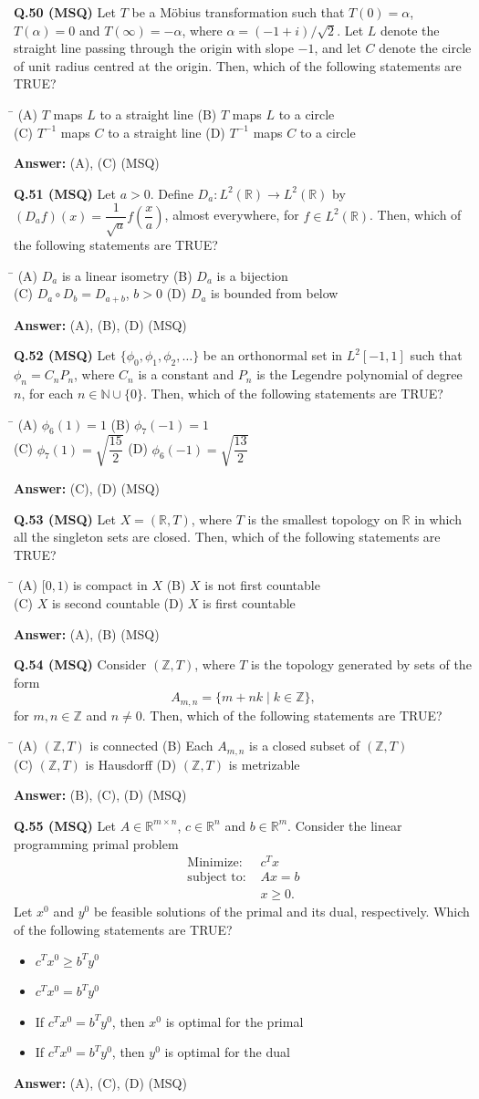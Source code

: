 \documentclass[11pt,a4paper]{article}
\newcommand{\optsfourA}[4]{%
  \begin{tabbing}
    \hspace{0.48\linewidth}\=\kill
    (A) #1 \> (B) #2 \\[2pt]
    (C) #3 \> (D) #4
  \end{tabbing}%
}
\newcommand{\optslistA}[4]{%
  \begin{itemize}
    \setlength{\itemsep}{2pt}\setlength{\parskip}{0pt}
    \item[(A)] #1
    \item[(B)] #2
    \item[(C)] #3
    \item[(D)] #4
  \end{itemize}%
}
\newcommand{\ans}[1]{\textbf{Answer:} #1\par\medskip}
\begin{document}
\textbf{Q.50 (MSQ)} Let $T$ be a M\"obius transformation such that $T(0) = \alpha$, $T(\alpha) = 0$ and $T(\infty) = -\alpha$, where $\alpha = (-1 + i)/\sqrt{2}$. Let $L$ denote the straight line passing through the origin with slope $-1$, and let $C$ denote the circle of unit radius centred at the origin. Then, which of the following statements are TRUE?
\optsfourA{$T$ maps $L$ to a straight line}{$T$ maps $L$ to a circle}{$T^{-1}$ maps $C$ to a straight line}{$T^{-1}$ maps $C$ to a circle}
\ans{(A), (C) (MSQ)}

\textbf{Q.51 (MSQ)} Let $a > 0$. Define $D_a : L^2(\mathbb{R}) \to L^2(\mathbb{R})$ by $(D_a f)(x) = \dfrac{1}{\sqrt{a}} f\!\left(\dfrac{x}{a}\right)$, almost everywhere, for $f \in L^2(\mathbb{R})$. Then, which of the following statements are TRUE?
\optsfourA{$D_a$ is a linear isometry}{$D_a$ is a bijection}{$D_a \circ D_b = D_{a+b}$, $b > 0$}{$D_a$ is bounded from below}
\ans{(A), (B), (D) (MSQ)}

\textbf{Q.52 (MSQ)} Let $\{\phi_0, \phi_1, \phi_2, \dots\}$ be an orthonormal set in $L^2[-1, 1]$ such that $\phi_n = C_n P_n$, where $C_n$ is a constant and $P_n$ is the Legendre polynomial of degree $n$, for each $n \in \mathbb{N} \cup \{0\}$. Then, which of the following statements are TRUE?
\optsfourA{$\phi_6(1) = 1$}{$\phi_7(-1) = 1$}{$\phi_7(1) = \sqrt{\dfrac{15}{2}}$}{$\phi_6(-1) = \sqrt{\dfrac{13}{2}}$}
\ans{(C), (D) (MSQ)}

\textbf{Q.53 (MSQ)} Let $X = (\mathbb{R}, T)$, where $T$ is the smallest topology on $\mathbb{R}$ in which all the singleton sets are closed. Then, which of the following statements are TRUE?
\optsfourA{$[0, 1)$ is compact in $X$}{$X$ is not first countable}{$X$ is second countable}{$X$ is first countable}
\ans{(A), (B) (MSQ)}

\textbf{Q.54 (MSQ)} Consider $(\mathbb{Z}, T)$, where $T$ is the topology generated by sets of the form
\[
  A_{m,n} = \{m + nk \mid k \in \mathbb{Z}\},
\]
for $m, n \in \mathbb{Z}$ and $n \neq 0$. Then, which of the following statements are TRUE?
\optsfourA{$(\mathbb{Z}, T)$ is connected}{Each $A_{m,n}$ is a closed subset of $(\mathbb{Z}, T)$}{$(\mathbb{Z}, T)$ is Hausdorff}{$(\mathbb{Z}, T)$ is metrizable}
\ans{(B), (C), (D) (MSQ)}

\textbf{Q.55 (MSQ)} Let $A \in \mathbb{R}^{m \times n}$, $c \in \mathbb{R}^n$ and $b \in \mathbb{R}^m$. Consider the linear programming primal problem
\begin{align*}
  \text{Minimize: } & c^T x \\
  \text{subject to: } & Ax = b \\
                      & x \ge 0.
\end{align*}
Let $x^0$ and $y^0$ be feasible solutions of the primal and its dual, respectively. Which of the following statements are TRUE?
\optslistA{$c^T x^0 \ge b^T y^0$}{$c^T x^0 = b^T y^0$}{If $c^T x^0 = b^T y^0$, then $x^0$ is optimal for the primal}{If $c^T x^0 = b^T y^0$, then $y^0$ is optimal for the dual}
\ans{(A), (C), (D) (MSQ)}
\end{document}
